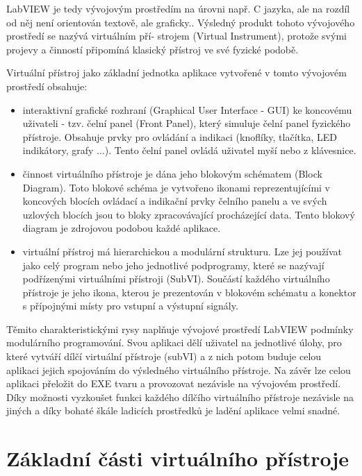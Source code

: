    LabVIEW je tedy vývojovým prostředím na úrovni např. C jazyka, ale na rozdíl od něj není
   orientován textově, ale graficky.. Výsledný produkt tohoto vývojového prostředí se nazývá
   virtuálním pří- strojem (Virtual Instrument), protože svými projevy a činností připomíná klasický
   přístroj ve své fyzické podobě.
  
   Virtuální přístroj jako základní jednotka aplikace vytvořené v tomto vývojovém prostředí
   obsahuje:
   \begin{itemize}
     \item interaktivní grafické rozhraní (Graphical User Interface - GUI) ke koncovému uživateli -
           tzv. čelní panel (Front Panel), který simuluje čelní panel fyzického přístroje. Obsahuje
           prvky pro ovládání a indikaci (knoflíky, tlačítka, LED indikátory, grafy ...). Tento
           čelní panel ovládá uživatel myší nebo z klávesnice.
     \item činnost virtuálního přístroje je dána jeho blokovým schématem (Block Diagram). Toto
           blokové schéma je vytvořeno ikonami reprezentujícími v koncových blocích ovládací a
           indikační prvky čelního panelu a ve svých uzlových blocích jsou to bloky zpracovávající
           procházející data. Tento blokový diagram je zdrojovou podobou každé aplikace.
     \item virtuální přístroj má hierarchickou a modulární strukturu. Lze jej používat jako celý
           program nebo jeho jednotlivé podprogramy, které se nazývají podřízenými virtuálními
           přístroji (SubVI). Součástí každého virtuálního přístroje je jeho ikona, kterou je
           prezentován v blokovém schématu a konektor s přípojnými místy pro vstupní a výstupní
           signály.         
   \end{itemize}
  
   Těmito charakteristickými rysy naplňuje vývojové prostředí LabVIEW podmínky modulárního
   programování. Svou aplikaci dělí uživatel na jednotlivé úlohy, pro které vytváří dílčí virtuální
   přístroje (subVI) a z nich potom buduje celou aplikaci jejich spojováním do výsledného
   virtuálního přístroje. Na závěr lze celou aplikaci přeložit do EXE tvaru a provozovat nezávisle
   na vývojovém prostředí. Díky možnosti vyzkoušet funkci každého dílčího virtuálního přístroje
   nezávisle na jiných a díky bohaté škále ladicích prostředků je ladění aplikace velmi snadné.
   
 \section{Základní části virtuálního přístroje}
